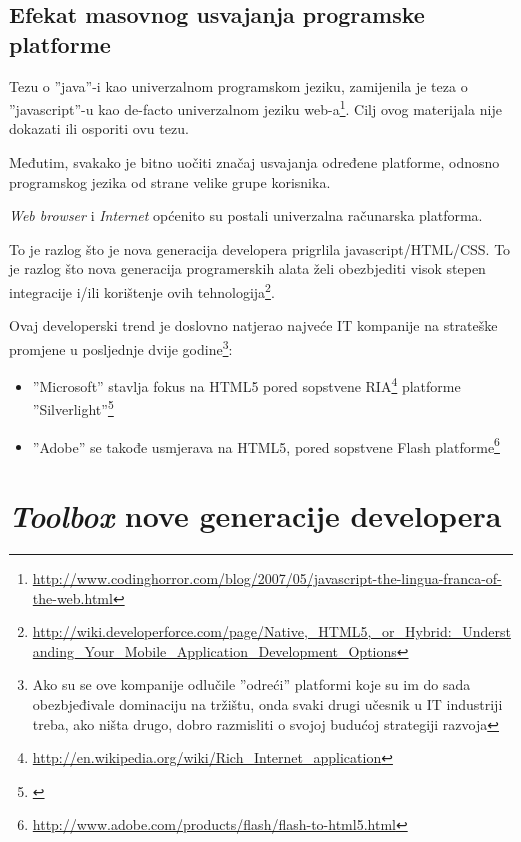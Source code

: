 \documentclass[times, utf8, seminar]{fit}
\begin{document}
\section{Efekat masovnog usvajanja programske platforme}

Tezu o ''java''-i kao univerzalnom programskom jeziku, zamijenila je teza o ''javascript''-u kao de-facto univerzalnom jeziku web-a\footnote{\url{http://www.codinghorror.com/blog/2007/05/javascript-the-lingua-franca-of-the-web.html}}. Cilj ovog materijala nije dokazati ili osporiti ovu tezu.

Međutim, svakako je bitno uočiti značaj usvajanja određene platforme, odnosno programskog jezika od strane velike grupe korisnika. 

\emph{Web browser} i \emph{Internet} općenito su postali univerzalna računarska platforma. 

To je razlog što je nova generacija developera prigrlila javascript/HTML/CSS. To je razlog što nova generacija programerskih alata želi obezbjediti visok stepen integracije i/ili korištenje ovih tehnologija\footnote{\url{http://wiki.developerforce.com/page/Native,_HTML5,_or_Hybrid:_Understanding_Your_Mobile_Application_Development_Options}}.

Ovaj developerski trend je doslovno natjerao najveće IT kompanije na strateške promjene u posljednje dvije godine\footnote{Ako su se ove kompanije odlučile ''odreći'' platformi koje su im do sada obezbjeđivale dominaciju na tržištu, onda svaki drugi učesnik u IT industriji treba, ako ništa drugo, dobro razmisliti o svojoj budućoj strategiji razvoja}: 
\begin{itemize}
  \item ''Microsoft'' stavlja fokus na HTML5 pored sopstvene RIA\footnote{\url{http://en.wikipedia.org/wiki/Rich_Internet_application}} platforme ''Silverlight''\footnote{\href{http://www.technologyreview.com/view/426083/html5-triumphant-silverlight-flash-discontinuing}{\color{blue}{Trijumf HTML5 nad zatvorenim vendorskim tehnologijama}}}
  \item ''Adobe'' se takođe usmjerava na HTML5, pored sopstvene Flash platforme\footnote{\url{http://www.adobe.com/products/flash/flash-to-html5.html}}

\end{itemize}

\chapter{\emph{Toolbox} nove generacije developera}
\end{document}
